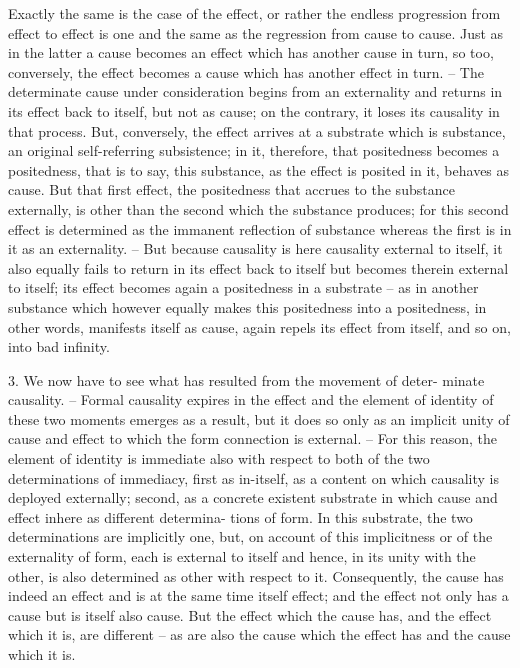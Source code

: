 Exactly the same is the case of the effect, or rather the endless progression
from effect to effect is one and the same as the regression from cause to cause.
Just as in the latter a cause becomes an effect which has another cause
in turn, so too, conversely, the effect becomes a cause which has another
effect in turn.
 – The determinate cause under consideration begins from
an externality and returns in its effect back to itself, but not as cause;
on the contrary, it loses its causality in that process. But, conversely, the
effect arrives at a substrate which is substance, an original self-referring
subsistence; in it, therefore, that positedness becomes a positedness, that is
to say, this substance, as the effect is posited in it, behaves as cause. But
that first effect, the positedness that accrues to the substance externally, is
other than the second which the substance produces; for this second effect is
determined as the immanent reflection of substance whereas the first is in it
as an externality. – But because causality is here causality external to itself,
it also equally fails to return in its effect back to itself but becomes therein
external to itself; its effect becomes again a positedness in a substrate – as
in another substance which however equally makes this positedness into a
positedness, in other words, manifests itself as cause, again repels its effect
from itself, and so on, into bad infinity.

3. We now have to see what has resulted from the movement of deter-
minate causality. – Formal causality expires in the effect and the element
of identity of these two moments emerges as a result, but it does so only
as an implicit unity of cause and effect to which the form connection is
external. – For this reason, the element of identity is immediate also with
respect to both of the two determinations of immediacy, first as in-itself,
as a content on which causality is deployed externally; second, as a concrete
existent substrate in which cause and effect inhere as different determina-
tions of form. In this substrate, the two determinations are implicitly one,
but, on account of this implicitness or of the externality of form, each is
external to itself and hence, in its unity with the other, is also determined
as other with respect to it. Consequently, the cause has indeed an effect and
is at the same time itself effect; and the effect not only has a cause but is itself
also cause. But the effect which the cause has, and the effect which it is, are
different – as are also the cause which the effect has and the cause which it
is.

